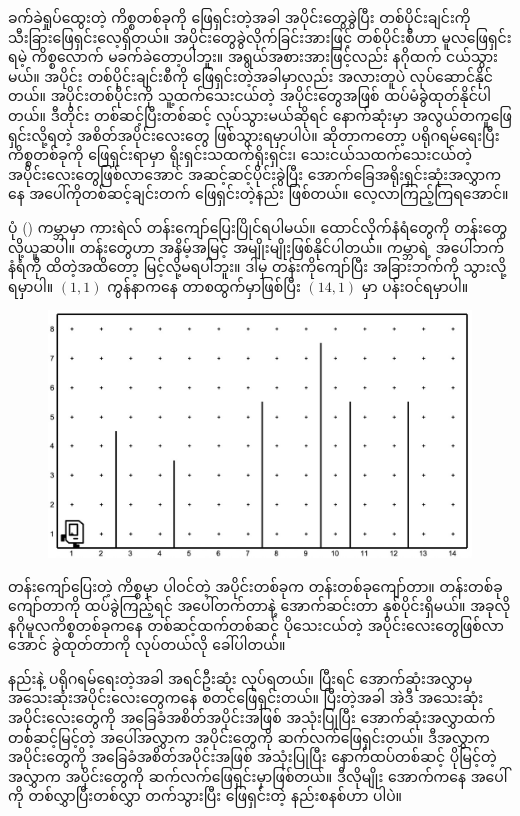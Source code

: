 ခက်ခဲရှုပ်ထွေးတဲ့ ကိစ္စတစ်ခုကို ဖြေရှင်းတဲ့အခါ အပိုင်းတွေခွဲပြီး တစ်ပိုင်းချင်းကို သီးခြားဖြေရှင်းလေ့ရှိတယ်။ အပိုင်းတွေခွဲလိုက်ခြင်းအားဖြင့် တစ်ပိုင်းစီဟာ မူလဖြေရှင်းရမဲ့ ကိစ္စလောက် မခက်ခဲတော့ပါဘူး။ အရွယ်အစားအားဖြင့်လည်း နဂိုထက် ငယ်သွားမယ်။ အပိုင်း တစ်ပိုင်းချင်းစီကို ဖြေရှင်းတဲ့အခါမှာလည်း အလားတူပဲ လုပ်ဆောင်နိုင်တယ်။ အပိုင်းတစ်ပိုင်းကို သူ့ထက်သေးငယ်တဲ့ အပိုင်းတွေအဖြစ် ထပ်မံခွဲထုတ်နိုင်ပါတယ်။ ဒီတိုင်း တစ်ဆင့်ပြီးတစ်ဆင့် လုပ်သွားမယ်ဆိုရင် နောက်ဆုံးမှာ အလွယ်တကူဖြေရှင်းလို့ရတဲ့ အစိတ်အပိုင်းလေးတွေ ဖြစ်သွားရမှာပါပဲ။  ဆိုတာကတော့ ပရိုဂရမ်ရေးပြီး ကိစ္စတစ်ခုကို ဖြေရှင်းရာမှာ ရိုးရှင်းသထက်ရိုးရှင်း၊ သေးငယ်သထက်သေးငယ်တဲ့ အပိုင်းလေးတွေဖြစ်လာအောင် အဆင့်ဆင့်ပိုင်းခွဲပြီး အောက်ခြေအရိုးရှင်းဆုံးအလွှာကနေ အပေါ်ကိုတစ်ဆင့်ချင်းတက် ဖြေရှင်းတဲ့နည်း ဖြစ်တယ်။ လေ့လာကြည့်ကြရအောင်။

ပုံ (\fRefNo{\ref{fig:hurdle_jumping_init}}) ကမ္ဘာမှာ ကားရဲလ် တန်းကျော်ပြေးပြိုင်ရပါမယ်။ ထောင်လိုက်နံရံတွေကို တန်းတွေလို့ယူဆပါ။ တန်းတွေဟာ အနိမ့်အမြင့် အမျိုးမျိုးဖြစ်နိုင်ပါတယ်။ ကမ္ဘာရဲ့ အပေါ်ဘက် နံရံကို ထိတဲ့အထိတော့ မြင့်လို့မရပါဘူး။ ဒါမှ တန်းကိုကျော်ပြီး အခြားဘက်ကို သွားလို့ရမှာပါ။ \((1, 1)\) ကွန်နာကနေ တာစထွက်မှာဖြစ်ပြီး \((14, 1)\) မှာ ပန်းဝင်ရမှာပါ။
%
\begin{figure}[htb!]
    \includegraphics[width=4.5in]{images/ch03/hurdle_jumping/init_w1.jpg}
    \caption{}
    \label{fig:hurdle_jumping_init}
\end{figure}
%

တန်းကျော်ပြေးတဲ့ ကိစ္စမှာ ပါဝင်တဲ့ အပိုင်းတစ်ခုက တန်းတစ်ခုကျော်တာ။ တန်းတစ်ခု ကျော်တာကို ထပ်ခွဲကြည့်ရင် အပေါ်တက်တာနဲ့ အောက်ဆင်းတာ နှစ်ပိုင်းရှိမယ်။ အခုလို နဂိုမူလကိစ္စတစ်ခုကနေ တစ်ဆင့်ထက်တစ်ဆင့် ပိုသေးငယ်တဲ့ အပိုင်းလေးတွေဖြစ်လာအောင် ခွဲထုတ်တာကို  လုပ်တယ်လို ခေါ်ပါတယ်။ 

 နည်းနဲ့ ပရိုဂရမ်ရေးတဲ့အခါ  အရင်ဦးဆုံး  လုပ်ရတယ်။ ပြီးရင် အောက်ဆုံးအလွှာမှ အသေးဆုံးအပိုင်းလေးတွေကနေ စတင်ဖြေရှင်းတယ်။ ပြီးတဲ့အခါ အဲဒီ အသေးဆုံး အပိုင်းလေးတွေကို အခြေခံအစိတ်အပိုင်းအဖြစ် အသုံးပြုပြီး  အောက်ဆုံးအလွှာထက် တစ်ဆင့်မြင့်တဲ့ အပေါ်အလွှာက အပိုင်းတွေကို ဆက်လက်ဖြေရှင်းတယ်။ ဒီအလွှာက အပိုင်းတွေကို  အခြေခံအစိတ်အပိုင်းအဖြစ် အသုံးပြုပြီး နောက်ထပ်တစ်ဆင့် ပိုမြင့်တဲ့အလွှာက အပိုင်းတွေကို ဆက်လက်ဖြေရှင်းမှာဖြစ်တယ်။ ဒီလိုမျိုး အောက်ကနေ အပေါ်ကို တစ်လွှာပြီးတစ်လွှာ တက်သွားပြီး ဖြေရှင်းတဲ့ နည်းစနစ်ဟာ  ပါပဲ။ 

